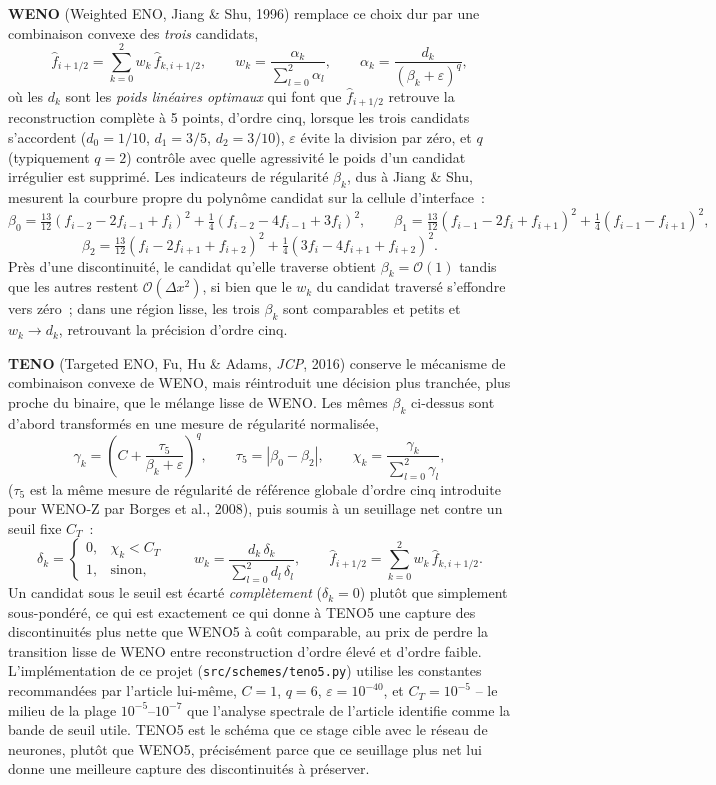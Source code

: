\documentclass[11pt]{article}
\begin{document}
\textbf{WENO} (Weighted ENO, Jiang \& Shu, 1996) remplace ce choix dur par
une combinaison convexe des \emph{trois} candidats,
\[
\hat f_{i+1/2} = \sum_{k=0}^{2} w_k\, \hat f_{k,i+1/2}, \qquad
w_k = \frac{\alpha_k}{\sum_{l=0}^{2}\alpha_l}, \qquad
\alpha_k = \frac{d_k}{(\beta_k + \varepsilon)^{q}},
\]
où les $d_k$ sont les \emph{poids linéaires optimaux} qui font que $\hat
f_{i+1/2}$ retrouve la reconstruction complète à 5 points, d'ordre cinq,
lorsque les trois candidats s'accordent ($d_0 = 1/10$, $d_1 = 3/5$,
$d_2 = 3/10$), $\varepsilon$ évite la division par zéro, et $q$
(typiquement $q=2$) contrôle avec quelle agressivité le poids d'un
candidat irrégulier est supprimé. Les indicateurs de régularité
$\beta_k$, dus à Jiang \& Shu, mesurent la courbure propre du polynôme
candidat sur la cellule d'interface~:
\[
\beta_0 = \tfrac{13}{12}(f_{i-2}-2f_{i-1}+f_i)^2 + \tfrac{1}{4}(f_{i-2}-4f_{i-1}+3f_i)^2, \qquad
\beta_1 = \tfrac{13}{12}(f_{i-1}-2f_i+f_{i+1})^2 + \tfrac{1}{4}(f_{i-1}-f_{i+1})^2,
\]
\[
\beta_2 = \tfrac{13}{12}(f_i-2f_{i+1}+f_{i+2})^2 + \tfrac{1}{4}(3f_i-4f_{i+1}+f_{i+2})^2.
\]
Près d'une discontinuité, le candidat qu'elle traverse obtient
$\beta_k=\mathcal{O}(1)$ tandis que les autres restent
$\mathcal{O}(\Delta x^2)$, si bien que le $w_k$ du candidat traversé
s'effondre vers zéro~; dans une région lisse, les trois $\beta_k$ sont
comparables et petits et $w_k \to d_k$, retrouvant la précision d'ordre
cinq.

\textbf{TENO} (Targeted ENO, Fu, Hu \& Adams, \emph{JCP}, 2016) conserve
le mécanisme de combinaison convexe de WENO, mais réintroduit une
décision plus tranchée, plus proche du binaire, que le mélange lisse de
WENO. Les mêmes $\beta_k$ ci-dessus sont d'abord transformés en une
mesure de régularité normalisée,
\[
\gamma_k = \left(C + \frac{\tau_5}{\beta_k+\varepsilon}\right)^{q},
\qquad
\tau_5 = |\beta_0 - \beta_2|,
\qquad
\chi_k = \frac{\gamma_k}{\sum_{l=0}^{2}\gamma_l},
\]
($\tau_5$ est la même mesure de régularité de référence globale d'ordre
cinq introduite pour WENO-Z par Borges et al., 2008), puis soumis à un
seuillage net contre un seuil fixe $C_T$~:
\[
\delta_k = \begin{cases} 0, & \chi_k < C_T \\ 1, & \text{sinon}, \end{cases}
\qquad
w_k = \frac{d_k\,\delta_k}{\sum_{l=0}^{2}d_l\,\delta_l},
\qquad
\hat f_{i+1/2} = \sum_{k=0}^{2} w_k\, \hat f_{k,i+1/2}.
\]
Un candidat sous le seuil est écarté \emph{complètement} ($\delta_k=0$)
plutôt que simplement sous-pondéré, ce qui est exactement ce qui donne à
TENO5 une capture des discontinuités plus nette que WENO5 à coût
comparable, au prix de perdre la transition lisse de WENO entre
reconstruction d'ordre élevé et d'ordre faible. L'implémentation de ce
projet (\texttt{src/schemes/teno5.py}) utilise les constantes
recommandées par l'article lui-même, $C=1$, $q=6$,
$\varepsilon=10^{-40}$, et $C_T=10^{-5}$ -- le milieu de la plage
$10^{-5}$--$10^{-7}$ que l'analyse spectrale de l'article identifie comme
la bande de seuil utile. TENO5 est le schéma que ce stage cible avec le
réseau de neurones, plutôt que WENO5, précisément parce que ce seuillage
plus net lui donne une meilleure capture des discontinuités à préserver.
\end{document}
